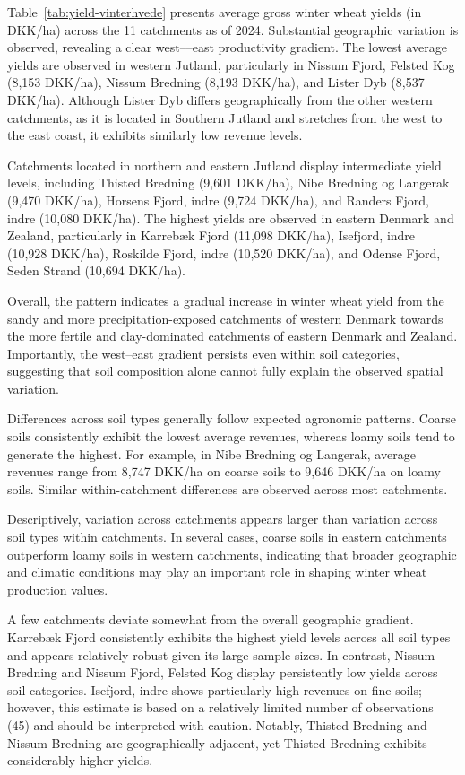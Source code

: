 \documentclass[12pt]{article}
\begin{document}
Table~\ref{tab:yield-vinterhvede} presents average gross winter wheat yields (in DKK/ha) across the 11 catchments as of 2024. 
Substantial geographic variation is observed, revealing a clear west--–east productivity gradient. The lowest average yields are observed in western Jutland, particularly in Nissum Fjord, Felsted Kog (8,153 DKK/ha), Nissum Bredning (8,193 DKK/ha), and Lister Dyb (8,537 DKK/ha). Although Lister Dyb differs geographically from the other western catchments, as it is located in Southern Jutland and stretches from the west to the east coast, it exhibits similarly low revenue levels. 

Catchments located in northern and eastern Jutland display intermediate yield levels, including Thisted Bredning (9,601 DKK/ha), Nibe Bredning og Langerak (9,470 DKK/ha), Horsens Fjord, indre (9,724 DKK/ha), and Randers Fjord, indre (10,080 DKK/ha). The highest yields are observed in eastern Denmark and Zealand, particularly in Karrebæk Fjord (11,098 DKK/ha), Isefjord, indre (10,928 DKK/ha), Roskilde Fjord, indre (10,520 DKK/ha), and Odense Fjord, Seden Strand (10,694 DKK/ha). 

Overall, the pattern indicates  a gradual increase in winter wheat yield from the sandy and more precipitation-exposed catchments of western Denmark towards the more fertile and clay-dominated catchments of eastern Denmark and Zealand. Importantly, the west--east gradient persists even within soil categories, suggesting that soil composition alone cannot fully explain the observed spatial variation.

Differences across soil types generally follow expected agronomic patterns. Coarse soils consistently exhibit the lowest average revenues, whereas loamy soils tend to generate the highest. For example, in Nibe Bredning og Langerak, average revenues range from 8,747 DKK/ha on coarse soils to 9,646 DKK/ha on loamy soils. Similar within-catchment differences are observed across most catchments.


Descriptively, variation across catchments appears larger than variation across soil types within catchments. In several cases, coarse soils in eastern catchments outperform loamy soils in western catchments, indicating that broader geographic and climatic conditions may play an important role in shaping winter wheat production values.

A few catchments deviate somewhat from the overall geographic gradient. Karrebæk Fjord consistently exhibits the highest yield levels across all soil types and appears relatively robust given its large sample sizes. In contrast, Nissum Bredning and Nissum Fjord, Felsted Kog display persistently low yields across soil categories. Isefjord, indre shows particularly high revenues on fine soils; however, this estimate is based on a relatively limited number of observations (45) and should be interpreted with caution. Notably, Thisted Bredning and Nissum Bredning are geographically adjacent, yet Thisted Bredning exhibits considerably higher yields.
\end{document}
